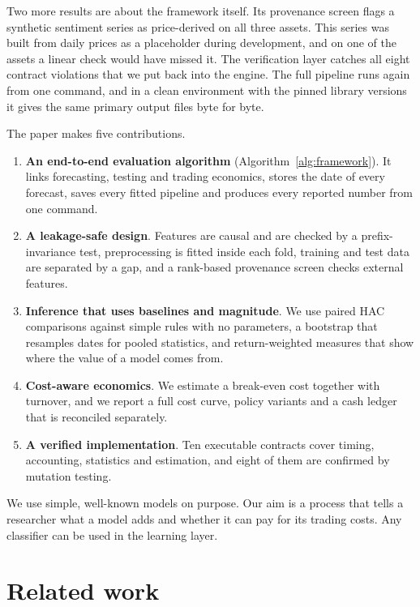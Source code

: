 \documentclass[preprint,12pt,authoryear,a4paper]{elsarticle}
\begin{document}
Two more results are about the framework itself. Its provenance screen flags a
synthetic sentiment series as price-derived on all three assets. This series was
built from daily prices as a placeholder during development, and on one of the
assets a linear check would have missed it. The verification layer catches all eight
contract violations that we put back into the engine. The full pipeline runs again
from one command, and in a clean environment with the pinned library versions it
gives the same primary output files byte for byte.

The paper makes five contributions.
\begin{enumerate}
\item \textbf{An end-to-end evaluation algorithm} (Algorithm~\ref{alg:framework}).
It links forecasting, testing and trading economics, stores the date of every
forecast, saves every fitted pipeline and produces every reported number from one
command.
\item \textbf{A leakage-safe design}. Features are causal and are checked by a
prefix-invariance test, preprocessing is fitted inside each fold, training and test
data are separated by a gap, and a rank-based provenance screen checks external
features.
\item \textbf{Inference that uses baselines and magnitude}. We use paired HAC
comparisons against simple rules with no parameters, a bootstrap that resamples
dates for pooled statistics, and return-weighted measures that show where the value
of a model comes from.
\item \textbf{Cost-aware economics}. We estimate a break-even cost together with
turnover, and we report a full cost curve, policy variants and a cash ledger that
is reconciled separately.
\item \textbf{A verified implementation}. Ten executable contracts cover timing,
accounting, statistics and estimation, and eight of them are confirmed by mutation
testing.
\end{enumerate}

We use simple, well-known models on purpose. Our aim is a process that tells a
researcher what a model adds and whether it can pay for its trading costs. Any
classifier can be used in the learning layer.

\section{Related work}\label{sec:related}
\end{document}
